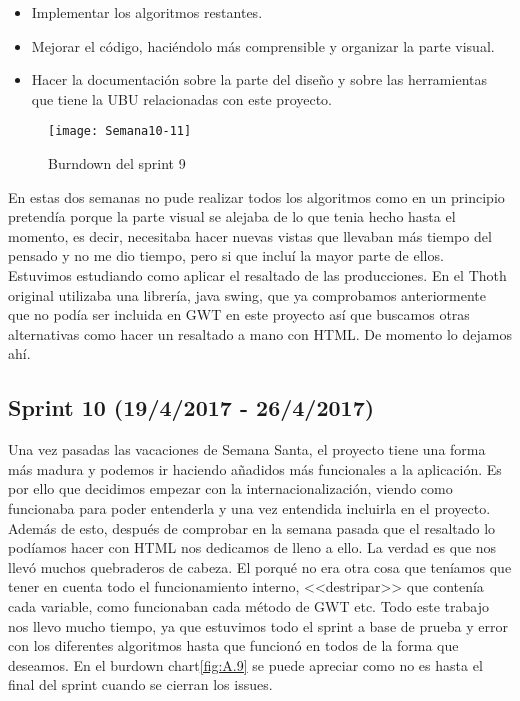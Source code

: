 \begin{itemize}
\item Implementar los algoritmos restantes.
\item Mejorar el código, haciéndolo más comprensible y organizar la parte visual.
\item Hacer la documentación sobre la parte del diseño y sobre las herramientas que tiene la UBU relacionadas con este proyecto.
\end{itemize}

\begin{figure}[h]
\centering
\texttt{[image: Semana10-11]}
\caption{Burndown del sprint 9}
\label{fig:A.8}
\end{figure}

En estas dos semanas no pude realizar todos los algoritmos como en un principio pretendía porque la parte visual se alejaba de lo que tenia hecho hasta el momento, es decir, necesitaba hacer nuevas vistas que llevaban más tiempo del pensado y no me dio tiempo, pero si que incluí la mayor parte de ellos. Estuvimos estudiando como aplicar el resaltado de las producciones. En el Thoth original utilizaba una librería, java swing, que ya comprobamos anteriormente que no podía ser incluida en GWT en este proyecto así que buscamos otras alternativas como hacer un resaltado a mano con HTML. De momento lo dejamos ahí.

\subsection{Sprint 10 (19/4/2017 - 26/4/2017)}

Una vez pasadas las vacaciones de Semana Santa, el proyecto tiene una forma más madura y podemos ir haciendo añadidos más funcionales a la aplicación. Es por ello que decidimos empezar con la internacionalización, viendo como funcionaba para poder entenderla y una vez entendida incluirla en el proyecto. Además de esto, después de comprobar en la semana pasada que el resaltado lo podíamos hacer con HTML nos dedicamos de lleno a ello. La verdad es que nos llevó muchos quebraderos de cabeza. El porqué no era otra cosa que teníamos que tener en cuenta todo el funcionamiento interno, <<destripar>> que contenía cada variable, como funcionaban cada método de GWT etc. Todo este trabajo nos llevo mucho tiempo, ya que estuvimos todo el sprint a base de prueba y error con los diferentes algoritmos hasta que funcionó en todos de la forma que deseamos. En el burdown chart\ref{fig:A.9} se puede apreciar como no es hasta el final del sprint cuando se cierran los issues.

